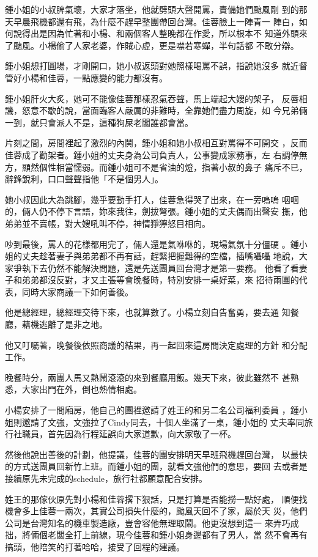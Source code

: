 鍾小姐的小叔脾氣壞，大家才落坐，他就劈頭大聲開罵，責備她們颱風剛
到的那天早晨飛機都還有飛，為什麼不趕早整團帶回台灣。佳蓉臉上一陣青一
陣白，如何說得出是因為忙著和小楊、和兩個客人整晚都在作愛，所以根本不
知道外頭來了颱風。小楊偷了人家老婆，作賊心虛，更是噤若寒蟬，半句話都
不敢分辯。

鍾小姐想打圓場，才剛開口，她小叔返頭對她照樣喝罵不誤，指說她沒多
就近督管好小楊和佳蓉，一點應變的能力都沒有。

鍾小姐肝火大炙，她可不能像佳蓉那樣忍氣吞聲，馬上端起大嫂的架子，
反唇相譏，怒意不歇的說，當面臨客人嚴厲的非難時，全靠她們盡力周旋，如
今兄弟倆一到，就只會派人不是，這種狗屎老闆誰都會當。

片刻之間，房間裡起了激烈的內鬨，鍾小姐和她小叔相互對罵得不可開交
，反而佳蓉成了勸架者。鍾小姐的丈夫身為公司負責人，公事變成家務事，左
右調停無方，顯然個性相當懦弱。而鍾小姐可不是省油的燈，指著小叔的鼻子
痛斥不已，辭鋒銳利，口口聲聲指他「不是個男人」。

她小叔因此大為跳腳，幾乎要動手打人，佳蓉急得哭了出來，在一旁嗚嗚
咽咽的，倆人仍不停下言語，妳來我往，劍拔弩張。鍾小姐的丈夫偶而出聲安
撫，他弟弟並不賣帳，對大嫂吼叫不停，神情猙獰怒目相向。

吵到最後，罵人的花樣都用完了，倆人還是氣咻咻的，現場氣氛十分僵硬
。鍾小姐的丈夫趁著妻子與弟弟都不再有話，趕緊把握難得的空檔，插嘴囁囁
地說，大家爭執下去仍然不能解決問題，還是先送團員回台灣才是第一要務。
他看了看妻子和弟弟都沒反對，才又主張等會晚餐時，特別安排一桌好菜，來
招待兩團的代表，同時大家商議一下如何善後。

他是總經理，總經理交待下來，也就算數了。小楊立刻自告奮勇，要去通
知餐廳，藉機逃離了是非之地。

他又叮囑著，晚餐後依照商議的結果，再一起回來這房間決定處理的方針
和分配工作。

晚餐時分，兩團人馬又熱鬧滾滾的來到餐廳用飯。幾天下來，彼此雖然不
甚熟悉，大家出門在外，倒也熱情相處。

小楊安排了一間廂房，他自己的團裡邀請了姓王的和另二名公司福利委員
，鍾小姐則邀請了文強，文強拉了Cindy同去，十個人坐滿了一桌，鍾小姐的
丈夫率同旅行社職員，首先因為行程延誤向大家道歉，向大家敬了一杯。

然後他說出善後的計劃，他提議，佳蓉的團安排明天早班飛機趕回台灣，
以最快的方式送團員回新竹上班。而鍾小姐的團，就看文強他們的意思，要回
去或者是接續原先未完成的schedule，旅行社都願意配合安排。

姓王的那傢伙原先對小楊和佳蓉撂下狠話，只是打算是否能撈一點好處，
順便找機會多上佳蓉一兩次，其實公司損失什麼的，颱風天回不了家，屬於天
災，他們公司是台灣知名的機車製造廠，豈會容他無理取鬧。他更沒想到這一
來弄巧成拙，將倆個老闆全打上前線，現今佳蓉和鍾小姐身邊都有了男人，當
然不會再有搞頭，他陪笑的打著哈哈，接受了回程的建議。

